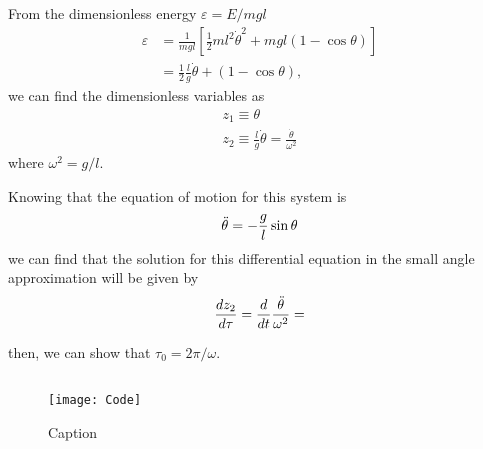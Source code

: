 \subsection{}
From the dimensionless energy $\varepsilon=E/mgl$ 
\begin{align*}
    \varepsilon&=\frac{1}{mgl}\left[\frac{1}{2}ml^2\dot{\theta}^2+mgl(1-\cos\theta)\right]\\
    &=\frac{1}{2}\frac{l}{g}\dot{\theta} + (1-\cos\theta),
\end{align*}
we can find the dimensionless variables as
\begin{align*}
    z_1\equiv\theta\\
    z_2\equiv\frac{l}{g}\dot{\theta}=\frac{\dot{\theta}}{\omega^2}
\end{align*}
where $\omega^2=g/l$.

Knowing that the equation of motion for this system is 
\begin{equation*}
    \Ddot{\theta}=-\frac{g}{l}\sin\theta
\end{equation*}
we can find that the solution for this differential equation in the small angle approximation will be given by
\begin{equation*}
\frac{dz_2}{d\tau}=\frac{d}{dt}
\frac{\Ddot{\theta}}{\omega^2}=    
\end{equation*}


then, we can show that
$\tau_0=2\pi/\omega$.

\subsection{}

\begin{figure}
    \centering
    \texttt{[image: Code]}
    \caption{Caption}
    \label{fig:my_label}
\end{figure}



